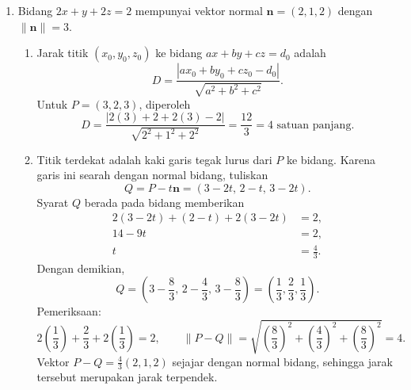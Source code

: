\documentclass[11pt,a4paper]{article}
\begin{document}
\begin{enumerate}
\begin{align*}
\begin{array}{ccc|ccc}
        0&0&1&5&-2&-1
    \end{array}\right).
\end{align*}
Jadi
\[
    \boxed{A^{-1}=\begin{pmatrix}
        -40&16&9\\
        13&-5&-3\\
        5&-2&-1
    \end{pmatrix}}.
\]
Sebagai pemeriksaan,
\[
    AA^{-1}=
    \begin{pmatrix}1&2&3\\2&5&3\\1&0&8\end{pmatrix}
    \begin{pmatrix}-40&16&9\\13&-5&-3\\5&-2&-1\end{pmatrix}
    =\begin{pmatrix}1&0&0\\0&1&0\\0&0&1\end{pmatrix}.
\]

\item 
Bidang $2x+y+2z=2$ mempunyai vektor normal $\mathbf{n}=(2,1,2)$
dengan $\|\mathbf{n}\|=3$.

\begin{enumerate}
\item Jarak titik $(x_0,y_0,z_0)$ ke bidang $ax+by+cz=d_0$ adalah
\[
    D=\frac{|ax_0+by_0+cz_0-d_0|}{\sqrt{a^2+b^2+c^2}}.
\]
Untuk $P=(3,2,3)$, diperoleh
\[
    D=\frac{|2(3)+2+2(3)-2|}{\sqrt{2^2+1^2+2^2}}
     =\frac{12}{3}
     =\boxed{4\text{ satuan panjang}}.
\]

\item 
Titik terdekat adalah kaki garis tegak lurus dari $P$ ke bidang.
Karena garis ini searah dengan normal bidang, tuliskan
\[
    Q=P-t\mathbf{n}=(3-2t,\,2-t,\,3-2t).
\]
Syarat $Q$ berada pada bidang memberikan
\begin{align*}
    2(3-2t)+(2-t)+2(3-2t)&=2,\\
    14-9t&=2,\\
    t&=\frac43.
\end{align*}
Dengan demikian,
\[
    Q=\left(3-\frac83,\,2-\frac43,\,3-\frac83\right)
     =\boxed{\left(\frac13,\frac23,\frac13\right)}.
\]
Pemeriksaan:
\[
    2\left(\frac13\right)+\frac23+2\left(\frac13\right)=2,
    \qquad
    \|P-Q\|=\sqrt{\left(\frac83\right)^2+
                       \left(\frac43\right)^2+
                       \left(\frac83\right)^2}=4.
\]
Vektor $P-Q=\tfrac43(2,1,2)$ sejajar dengan normal bidang, sehingga
jarak tersebut merupakan jarak terpendek.

\end{enumerate}
\end{enumerate}
\end{document}
